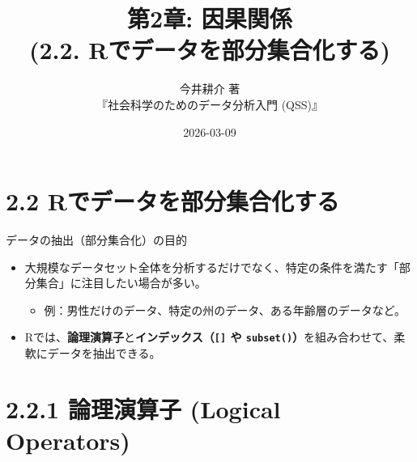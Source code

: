 \documentclass[
  ignorenonframetext,
]{beamer}
\title{第2章: 因果関係\\
(2.2. Rでデータを部分集合化する)}
\subtitle{今井耕介 著\\
『社会科学のためのデータ分析入門 (QSS)』}
\author{}
\date{\vspace{-2.5em}2026-03-09}
\providecommand{\tightlist}{%
  \setlength{\itemsep}{0pt}\setlength{\parskip}{0pt}}
\begin{document}
\frame{\titlepage}

\hypertarget{rux3067ux30c7ux30fcux30bfux3092ux90e8ux5206ux96c6ux5408ux5316ux3059ux308b}{%
\section{2.2
Rでデータを部分集合化する}\label{rux3067ux30c7ux30fcux30bfux3092ux90e8ux5206ux96c6ux5408ux5316ux3059ux308b}}

\begin{frame}[fragile]{データの抽出（部分集合化）の目的}
\protect\hypertarget{ux30c7ux30fcux30bfux306eux62bdux51faux90e8ux5206ux96c6ux5408ux5316ux306eux76eeux7684}{}
\begin{itemize}
\tightlist
\item
  大規模なデータセット全体を分析するだけでなく、特定の条件を満たす「部分集合」に注目したい場合が多い。

  \begin{itemize}
  \tightlist
  \item
    例：男性だけのデータ、特定の州のデータ、ある年齢層のデータなど。
  \end{itemize}
\item
  Rでは、\textbf{論理演算子}と\textbf{インデックス（\texttt{{[}{]}} や
  \texttt{subset()}）}を組み合わせて、柔軟にデータを抽出できる。
\end{itemize}
\end{frame}

\hypertarget{ux8ad6ux7406ux6f14ux7b97ux5b50-logical-operators}{%
\section{2.2.1 論理演算子 (Logical
Operators)}\label{ux8ad6ux7406ux6f14ux7b97ux5b50-logical-operators}}
\end{document}
